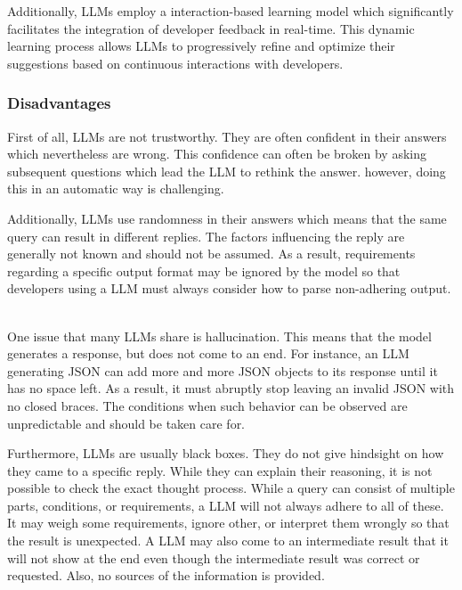 {Additionally, \acp{LLM} employ a interaction-based learning model which significantly facilitates the integration of developer feedback in real-time. This dynamic learning process allows \acp{LLM} to progressively refine and optimize their suggestions based on continuous interactions with developers.~\cite{10.1145/3581641.3584037} 


\subsubsection{Disadvantages}

First of all, \acp{LLM} are not trustworthy. They are often confident in their answers which nevertheless are wrong. This confidence can often be broken by asking subsequent questions which lead the \ac{LLM} to rethink the answer. however, doing this in an automatic way is challenging.~\cite{azaria2023internal}

Additionally, \acp{LLM} use randomness in their answers which means that the same query can result in different replies. The factors influencing the reply are generally not known and should not be assumed. As a result, requirements regarding a specific output format may be ignored by the model so that developers using a \ac{LLM} must always consider how to parse non-adhering output. ~\cite{hu2023large}

One issue that many \acp{LLM} share is hallucination. This means that the model generates a response, but does not come to an end. For instance, an \ac{LLM} generating \ac{JSON} can add more and more \ac{JSON} objects to its response until it has no space left. As a result, it must abruptly stop leaving an invalid \ac{JSON} with no closed braces.  The conditions when such behavior can be observed are unpredictable and should be taken care for. 

Furthermore, \ac{LLM}s are usually black boxes. They do not give hindsight on how they came to a specific reply. While they can explain their reasoning, it is not possible to check the exact thought process.
While a query can consist of multiple parts, conditions, or requirements, a \ac{LLM} will not always adhere to all of these. It may weigh some requirements, ignore other, or interpret them wrongly so that the result is unexpected. A \ac{LLM} may also come to an intermediate result that it will not show at the end even though the intermediate result was correct or requested. Also, no sources of the information is provided.~\cite{chen2023instructzero}

}
